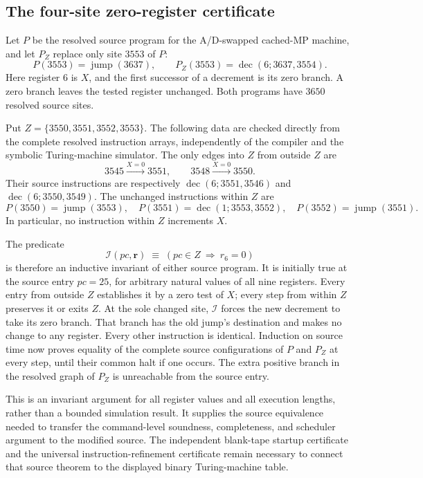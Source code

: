 \subsection{The four-site zero-register certificate}
Let $P$ be the resolved source program for the A/D-swapped cached-MP
machine, and let $P_Z$ replace only site $3553$ of $P$:
\[
  P(3553)=\operatorname{jump}(3637),\qquad
  P_Z(3553)=\operatorname{dec}(6;3637,3554).
\]
Here register $6$ is $X$, and the first successor of a decrement is its
zero branch.  A zero branch leaves the tested register unchanged.
Both programs have $3650$ resolved source sites.

Put $Z=\{3550,3551,3552,3553\}$.  The following data are checked directly
from the complete resolved instruction arrays, independently of the
compiler and the symbolic Turing-machine simulator.  The only edges into
$Z$ from outside $Z$ are
\[
  3545\xrightarrow{X=0}3551,\qquad
  3548\xrightarrow{X=0}3550.
\]
Their source instructions are respectively
$\operatorname{dec}(6;3551,3546)$ and
$\operatorname{dec}(6;3550,3549)$.
The unchanged instructions within $Z$ are
\[
  P(3550)=\operatorname{jump}(3553),\quad
  P(3551)=\operatorname{dec}(1;3553,3552),\quad
  P(3552)=\operatorname{jump}(3551).
\]
In particular, no instruction within $Z$ increments $X$.

The predicate
\[
  \mathcal I(pc,\mathbf r)\;\equiv\;(pc\in Z\ \Longrightarrow\ r_6=0)
\]
is therefore an inductive invariant of either source program.  It is
initially true at the source entry $pc=25$, for arbitrary natural values
of all nine registers.  Every entry from outside $Z$ establishes it by a
zero test of $X$; every step from within $Z$ preserves it or exits $Z$.
At the sole changed site, $\mathcal I$ forces the new decrement to take
its zero branch.  That branch has the old jump's destination and makes
no change to any register.  Every other instruction is identical.
Induction on source time now proves equality of the complete source
configurations of $P$ and $P_Z$ at every step, until their common halt if
one occurs.  The extra positive branch in the resolved graph of $P_Z$
is unreachable from the source entry.

This is an invariant argument for all register values and all execution
lengths, rather than a bounded simulation result.  It supplies the source
equivalence needed to transfer the command-level soundness, completeness,
and scheduler argument to the modified source.  The independent blank-tape
startup certificate and the universal instruction-refinement certificate
remain necessary to connect that source theorem to the displayed binary
Turing-machine table.
